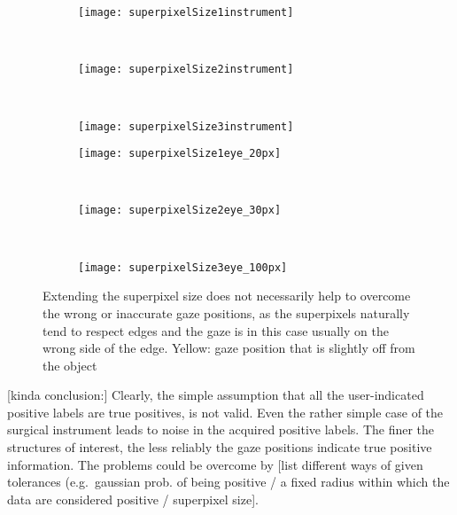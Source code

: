 \begin{figure}[ht]
	\centering
	\begin{subfigure}[h]{0.31\textwidth}
	      \texttt{[image: superpixelSize1instrument]}
	\end{subfigure}
	~
	\begin{subfigure}[h]{0.31\textwidth}
		\texttt{[image: superpixelSize2instrument]}	
	\end{subfigure}
	~
	\begin{subfigure}[h]{0.31\textwidth}
		\texttt{[image: superpixelSize3instrument]}	
	\end{subfigure}	
	
	\vspace{3mm}
	\begin{subfigure}[h]{0.31\textwidth}
	      \texttt{[image: superpixelSize1eye\_20px]}
	\end{subfigure}
	~
	\begin{subfigure}[h]{0.31\textwidth}
		\texttt{[image: superpixelSize2eye\_30px]}	
	\end{subfigure}
	~
	\begin{subfigure}[h]{0.31\textwidth}
		\texttt{[image: superpixelSize3eye\_100px]}	
	\end{subfigure}	
	\caption{Extending the superpixel size does not necessarily help to overcome the wrong or inaccurate gaze positions, as the superpixels naturally tend to respect edges and the gaze is in this case usually on the wrong side of the edge. Yellow: gaze position that is slightly off from the object}
	\label{fig:gazeOffSuperpixelSize}
\end{figure}
[kinda conclusion:]
Clearly, the simple assumption that all the user-indicated positive labels are true positives, is not valid. 
Even the rather simple case of the surgical instrument leads to noise in the acquired positive labels. The finer the structures of interest, the less reliably the gaze positions indicate true positive information. 
The problems could be overcome by [list different ways of given tolerances (e.g.\ gaussian prob. of being positive / a fixed radius within which the data are considered positive / superpixel size]. 
